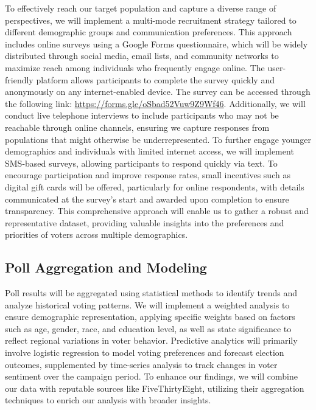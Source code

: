 \documentclass[
  letterpaper,
  DIV=11,
  numbers=noendperiod]{scrartcl}
\begin{document}
To effectively reach our target population and capture a diverse range
of perspectives, we will implement a multi-mode recruitment strategy
tailored to different demographic groups and communication preferences.
This approach includes online surveys using a Google Forms
questionnaire, which will be widely distributed through social media,
email lists, and community networks to maximize reach among individuals
who frequently engage online. The user-friendly platform allows
participants to complete the survey quickly and anonymously on any
internet-enabled device. The survey can be accessed through the
following link: \url{https://forms.gle/oSbad52Vuw9Z9Wf46}. Additionally,
we will conduct live telephone interviews to include participants who
may not be reachable through online channels, ensuring we capture
responses from populations that might otherwise be underrepresented. To
further engage younger demographics and individuals with limited
internet access, we will implement SMS-based surveys, allowing
participants to respond quickly via text. To encourage participation and
improve response rates, small incentives such as digital gift cards will
be offered, particularly for online respondents, with details
communicated at the survey's start and awarded upon completion to ensure
transparency. This comprehensive approach will enable us to gather a
robust and representative dataset, providing valuable insights into the
preferences and priorities of voters across multiple demographics.

\hypertarget{poll-aggregation-and-modeling}{%
\subsection{Poll Aggregation and
Modeling}\label{poll-aggregation-and-modeling}}

Poll results will be aggregated using statistical methods to identify
trends and analyze historical voting patterns. We will implement a
weighted analysis to ensure demographic representation, applying
specific weights based on factors such as age, gender, race, and
education level, as well as state significance to reflect regional
variations in voter behavior. Predictive analytics will primarily
involve logistic regression to model voting preferences and forecast
election outcomes, supplemented by time-series analysis to track changes
in voter sentiment over the campaign period. To enhance our findings, we
will combine our data with reputable sources like FiveThirtyEight,
utilizing their aggregation techniques to enrich our analysis with
broader insights.
\end{document}
